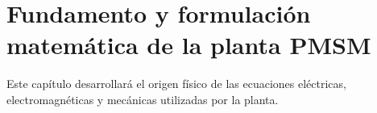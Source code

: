 \section{Fundamento y formulación matemática de la planta PMSM}

Este capítulo desarrollará el origen físico de las ecuaciones eléctricas, electromagnéticas y mecánicas utilizadas por la planta.
